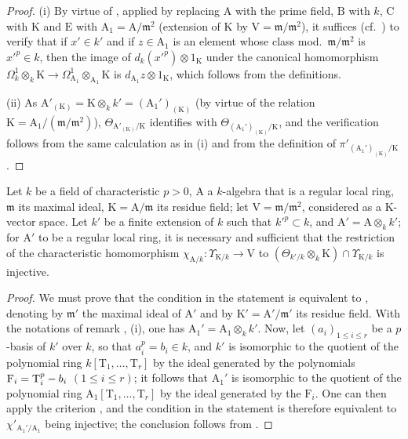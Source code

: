 \begin{proof}
(i) By virtue of , applied by replacing $\mathrm{A}$ with the prime field, $\mathrm{B}$ with $k$, $\mathrm{C}$ with $\mathrm{K}$ and $\mathrm{E}$ with $\mathrm{A}_1=\mathrm{A}/\mathfrak{m}^2$ (extension of $\mathrm{K}$ by $\mathrm{V}=\mathfrak{m}/\mathfrak{m}^2$), it suffices (cf.~) to verify that if $x'\in k'$ and if $z\in\mathrm{A}_1$ is an element whose class mod.~$\mathfrak{m}/\mathfrak{m}^2$ is $x'^p\in k$, then the image of $d_k(x'^p)\otimes 1_\mathrm{K}$ under the canonical homomorphism $\Omega^1_k\otimes_k\mathrm{K}\to\Omega^1_{\mathrm{A}_1}\otimes_{\mathrm{A}_1}\mathrm{K}$ is $d_{\mathrm{A}_1}z\otimes 1_\mathrm{K}$, which follows from the definitions.

(ii) As $\mathrm{A}'_{(\mathrm{K})}=\mathrm{K}\otimes_kk'=(\mathrm{A}_1')_{(\mathrm{K})}$ (by virtue of the relation $\mathrm{K}=\mathrm{A}_1/(\mathfrak{m}/\mathfrak{m}^2)$), $\Theta_{\mathrm{A}'_{(\mathrm{K})}/\mathrm{K}}$ identifies with $\Theta_{(\mathrm{A}_1')_{(\mathrm{K})}/\mathrm{K}}$, and the verification follows from the same calculation as in (i) and from the definition of $\pi'_{(\mathrm{A}_1')_{(\mathrm{K})}/\mathrm{K}}$.
\end{proof}

\begin{proposition}[22.5.7]
\label{0.22.5.7}
Let $k$ be a field of characteristic $p>0$, $\mathrm{A}$ a $k$-algebra that is a regular local ring, $\mathfrak{m}$ its maximal ideal, $\mathrm{K}=\mathrm{A}/\mathfrak{m}$ its residue field; let $\mathrm{V}=\mathfrak{m}/\mathfrak{m}^2$, considered as a $\mathrm{K}$-vector space.
Let $k'$ be a finite extension of $k$ such that $k'^p\subset k$, and $\mathrm{A}'=\mathrm{A}\otimes_kk'$; for $\mathrm{A}'$ to be a regular local ring, it is necessary and sufficient that the restriction of the characteristic homomorphism $\chi_{\mathrm{A}/k}:\Upsilon_{\mathrm{K}/k}\to\mathrm{V}$  to $(\Theta_{k'/k}\otimes_k\mathrm{K})\cap\Upsilon_{\mathrm{K}/k}$ is injective.
\end{proposition}

\begin{proof}
We must prove that the condition in the statement is equivalent to , denoting by $\mathfrak{m}'$ the maximal ideal of $\mathrm{A}'$ and by $\mathrm{K}'=\mathrm{A}'/\mathfrak{m}'$ its residue field.
With the notations of remark , (i), one has $\mathrm{A}_1'=\mathrm{A}_1\otimes_kk'$.
Now, let $(a_i)_{1\leq i\leq r}$ be a $p$-basis of $k'$ over $k$, so that $a_i^p=b_i\in k$, and $k'$ is isomorphic to the quotient of the polynomial ring
$k[\mathrm{T}_1,\ldots,\mathrm{T}_r]$ by the ideal generated by the polynomials $\mathrm{F}_i=\mathrm{T}_i^p- b_i$ $(1\leq i\leq r)$; it follows that $\mathrm{A}_1'$ is isomorphic to the quotient of the polynomial ring $\mathrm{A}_1[\mathrm{T}_1,\ldots,\mathrm{T}_r]$ by the ideal generated by the $\mathrm{F}_i$.
One can then apply the criterion , and the condition in the statement is therefore equivalent to $\chi'_{\mathrm{A}_1'/\mathrm{A}_1}$ being injective; the conclusion follows from .
\end{proof}

